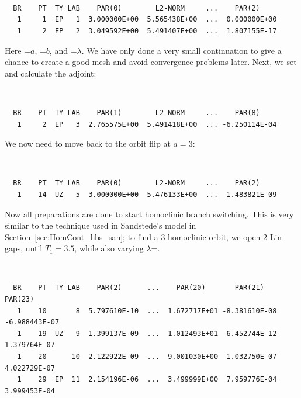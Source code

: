 \begin{center}
\\
\\
\\
\end{center}
\begin{verbatim}
  BR    PT  TY LAB    PAR(0)        L2-NORM     ...    PAR(2)     
   1     1  EP   1  3.000000E+00  5.565438E+00  ...  0.000000E+00
   1     2  EP   2  3.049592E+00  5.491407E+00  ...  1.807155E-17
\end{verbatim}
Here =$a$, =$b$, and
=$\lambda$. We have only done a
very small continuation to give \AUTO a chance to create a good mesh
and avoid convergence problems later.
Next, we set  and calculate the adjoint:
\begin{center}
\\
\end{center}
\begin{verbatim}
  BR    PT  TY LAB    PAR(1)        L2-NORM     ...    PAR(8)     
   1     2  EP   3  2.765575E+00  5.491418E+00  ... -6.250114E-04
\end{verbatim}
We now need to move back to the orbit flip at $a=3$:
\begin{center}
\\
\end{center}
\begin{verbatim}
  BR    PT  TY LAB    PAR(0)        L2-NORM     ...    PAR(2)     
   1    14  UZ   5  3.000000E+00  5.476133E+00  ...  1.483821E-09
\end{verbatim}
Now all preparations are done to start homoclinic branch
switching. This is very similar to the technique used in 
Sandstede's model in Section~\ref{sec:HomCont_hbs_san}; 
to find a 3-homoclinic orbit, we open 2 Lin gaps,
until $T_1=3.5$, while also varying $\lambda$=.
\begin{center}
\\
\end{center}
\begin{verbatim}
  BR    PT  TY LAB    PAR(2)      ...    PAR(20)       PAR(21)       PAR(23)  
   1    10       8  5.797610E-10  ...  1.672717E+01 -8.381610E-08 -6.988443E-07
   1    19  UZ   9  1.399137E-09  ...  1.012493E+01  6.452744E-12  1.379764E-07
   1    20      10  2.122922E-09  ...  9.001030E+00  1.032750E-07  4.022729E-07
   1    29  EP  11  2.154196E-06  ...  3.499999E+00  7.959776E-04  3.999453E-04
\end{verbatim}
